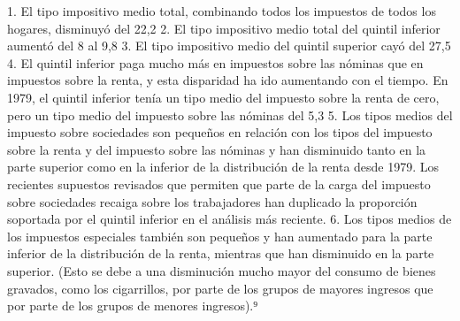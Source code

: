 \documentclass[10pt,a4paper]{article}
\begin{document}
1. El tipo impositivo medio total, combinando todos los impuestos de todos los hogares, disminuyó del 22,2 %
2. El tipo impositivo medio total del quintil inferior aumentó del 8 al 9,8 %
3. El tipo impositivo medio del quintil superior cayó del 27,5 %
4. El quintil inferior paga mucho más en impuestos sobre las nóminas que en impuestos sobre la renta, y esta disparidad ha ido aumentando con el tiempo. En 1979, el quintil inferior tenía un tipo medio del impuesto sobre la renta de cero, pero un tipo medio del impuesto sobre las nóminas del 5,3 %
5. Los tipos medios del impuesto sobre sociedades son pequeños en relación con los tipos del impuesto sobre la renta y del impuesto sobre las nóminas y han disminuido tanto en la parte superior como en la inferior de la distribución de la renta desde 1979. Los recientes supuestos revisados que permiten que parte de la carga del impuesto sobre sociedades recaiga sobre los trabajadores han duplicado la proporción soportada por el quintil inferior en el análisis más reciente.
6. Los tipos medios de los impuestos especiales también son pequeños y han aumentado para la parte inferior de la distribución de la renta, mientras que han disminuido en la parte superior. (Esto se debe a una disminución mucho mayor del consumo de bienes gravados, como los cigarrillos, por parte de los grupos de mayores ingresos que por parte de los grupos de menores ingresos).⁹
\end{document}
